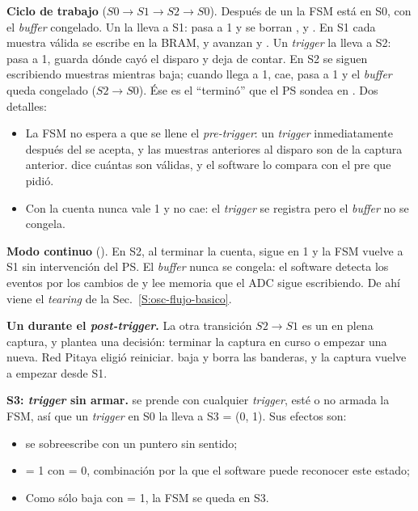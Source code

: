 \textbf{Ciclo de trabajo} ($S0\rightarrow S1\rightarrow S2\rightarrow S0$).
Después de un  la FSM está en S0, con el \emph{buffer} congelado. Un
 la lleva a S1:  pasa a 1 y se borran
,  y . En S1
cada muestra válida se escribe en la BRAM, y avanzan  y
. Un \emph{trigger} la lleva a S2:  pasa a 1,
 guarda dónde cayó el disparo y  deja
de contar. En S2 se siguen escribiendo muestras mientras 
baja; cuando llega a 1,  cae,  pasa a 1 y
el \emph{buffer} queda congelado ($S2\rightarrow S0$). Ése es el ``terminó'' que el PS
sondea en . Dos detalles:
\begin{itemize}
  \item La FSM no espera a que se llene el \emph{pre-trigger}: un \emph{trigger} inmediatamente
    después del  se acepta, y las muestras anteriores al disparo son
    de la captura anterior.  dice cuántas son válidas, y el
    software lo compara con el pre que pidió.
  \item Con  la cuenta nunca vale 1 y  no cae:
    el \emph{trigger} se registra pero el \emph{buffer} no se congela.
\end{itemize}

\textbf{Modo continuo} (). En S2, al terminar la cuenta,
 sigue en 1 y la FSM vuelve a S1 sin intervención del PS. El
\emph{buffer} nunca se congela: el software detecta los eventos por los cambios de
 y lee memoria que el ADC sigue escribiendo. De ahí viene
el \emph{tearing} de la Sec.~\ref{S:osc-flujo-basico}.

\textbf{Un  durante el \emph{post-trigger}.} La otra transición
$S2\rightarrow S1$ es un  en plena captura, y plantea una decisión:
terminar la captura en curso o empezar una nueva. Red Pitaya eligió reiniciar.
 baja  y borra las banderas, y la captura
vuelve a empezar desde S1.

\textbf{S3: \emph{trigger} sin armar.}  se prende con cualquier
\emph{trigger}, esté o no armada la FSM, así que un \emph{trigger} en S0 la lleva a
S3 = (0, 1). Sus efectos son:
\begin{itemize}
  \item {} se sobreescribe con un puntero sin sentido;
  \item {} = 1 con  = 0, combinación por
    la que el software puede reconocer este estado;
  \item Como  sólo baja con  = 1, la FSM
    se queda en S3.
\end{itemize}

